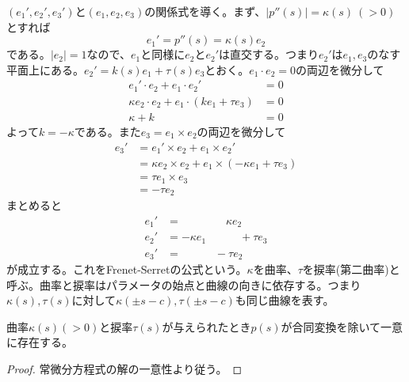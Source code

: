     $(e_1', e_2', e_3')$と$(e_1, e_2, e_3)$の関係式を導く。まず、$|p''(s)| = \kappa(s)\ (> 0)$とすれば
        \[e_1' = p''(s) = \kappa(s)e_2\]
    である。$|e_2| = 1$なので、$e_1$と同様に$e_2$と$e_2'$は直交する。つまり$e_2'$は$e_1, e_3$のなす平面上にある。$e_2' = k(s)e_1 + \tau(s)e_3$とおく。$e_1 \cdot e_2 = 0$の両辺を微分して
    \begin{align*}
        e_1' \cdot e_2 + e_1 \cdot e_2' &= 0\\
        \kappa e_2\cdot e_2 + e_1\cdot (ke_1 + \tau e_3) &= 0\\
        \kappa + k &= 0
    \end{align*}
    よって$k = -\kappa$である。また$e_3 = e_1 \times e_2$の両辺を微分して
    \begin{align*}
        e_3' &= e_1' \times e_2 + e_1 \times e_2'\\
             &= \kappa e_2 \times e_2 + e_1 \times (-\kappa e_1 + \tau e_3)\\
             &= \tau e_1 \times e_3\\
             &= -\tau e_2
    \end{align*}
    まとめると
    \begin{align*}
        e_1' &= \qquad\qquad \kappa e_2\\
        e_2' &= -\kappa e_1 \quad\qquad +\tau e_3\\
        e_3' &= \quad\qquad -\tau e_2
    \end{align*}
    が成立する。これをFrenet-Serretの公式という。$\kappa$を曲率、$\tau$を捩率(第二曲率)と呼ぶ。曲率と捩率はパラメータの始点と曲線の向きに依存する。つまり$\kappa(s), \tau(s)$に対して$\kappa(\pm s - c), \tau(\pm s - c)$も同じ曲線を表す。
    \begin{thm}[空間曲線の基本定理]
        曲率$\kappa(s)(> 0)$と捩率$\tau(s)$が与えられたとき$p(s)$が合同変換を除いて一意に存在する。
    \end{thm}
    \begin{proof}
        常微分方程式の解の一意性より従う。
    \end{proof}
